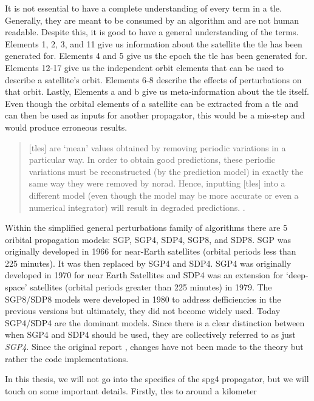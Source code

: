 It is not essential to have a complete understanding of every term in a
\gls{tle}. Generally, they are meant to be consumed by an algorithm and are not
human readable. Despite this, it is good to have a general understanding of the
terms.  Elements 1, 2, 3, and 11 give us information about the satellite the
\gls{tle} has been generated for. Elements 4 and 5 give us the epoch the
\gls{tle} has been generated for. Elements 12-17 give us the independent orbit
elements that can be used to describe a satellite's orbit. Elements 6-8
describe the effects of perturbations on that orbit. Lastly, Elements a and b
give us meta-information about the \gls{tle} itself. Even though the orbital
elements of a satellite can be extracted from a \gls{tle} and can then be used
as inputs for another propagator, this would be a mis-step and would produce
erroneous results. 

\begin{quote}
[\glspl{tle}] are `mean' values obtained by removing
periodic variations in a particular way. In order to obtain good predictions,
these periodic variations must be reconstructed (by the prediction model) in
exactly the same way they were removed by \gls{norad}. Hence, inputting
[\glspl{tle}] into a different model (even though the model may be more accurate or even
a numerical integrator) will result in degraded predictions. \cite{hoots_spacetrack_1980}.
\end{quote}

Within the simplified general perturbations family of algorithms there are 5
oribital propagation models: SGP, SGP4, SDP4, SGP8, and SDP8. SGP was
originally developed in 1966 for near-Earth satellites (orbital periods less
than 225 minutes). It was then replaced by SGP4 and SDP4. SGP4 was originally
developed in 1970 for near Earth Satellites and SDP4 was an extension for
`deep-space' satellites (orbital periods greater than 225 minutes) in 1979.
The SGP8/SDP8 models were developed in 1980 to address defficiencies in the
previous versions but ultimately, they did not become widely used.  Today
SGP4/SDP4 are the dominant models.  Since there is a clear distinction between
when SGP4 and SDP4 should be used, they are collectively referred to as just
\textit{SGP4}. Since the original report \cite{hoots_spacetrack_1980}, changes
have not been made to the theory but rather the code implementations.

In this thesis, we will not go into the specifics of the \gls{spg4} propagator,
but we will touch on some important details. Firstly, \glspl{tle} to around a
kilometer 






